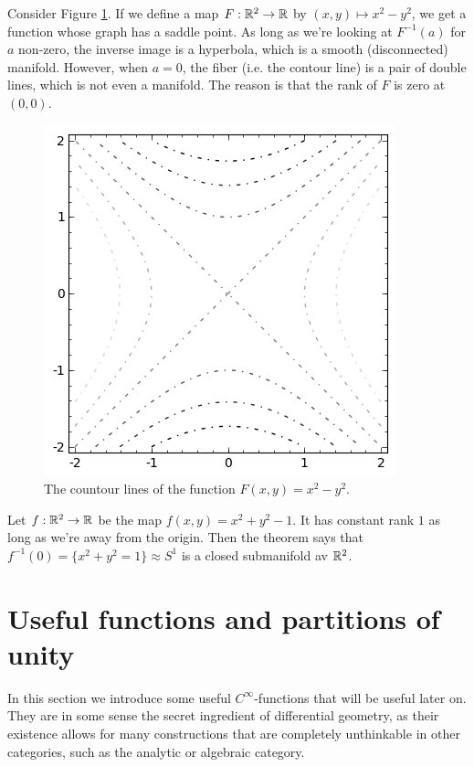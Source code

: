 \documentclass[11pt, english]{article}
\begin{document}
\begin{example}
Consider Figure \ref{contour}. If we define a map $F:\mathbb{R}^2\to \mathbb{R}$ by $(x,y) \mapsto x^2-y^2$, we get a function whose graph has a saddle point. As long as we're looking at $F^{-1}(a)$ for $a$ non-zero, the inverse image is a hyperbola, which is a smooth (disconnected) manifold. However, when $a=0$, the fiber (i.e. the contour line) is a pair of double lines, which is not even a manifold. The reason is that the rank of $F$ is zero at $(0,0)$.
\begin{figure}[ht]
\begin{center}
\includegraphics[scale=0.7]{contours}
\end{center}
\caption{The countour lines of the function $F(x,y)=x^2-y^2$.}
\label{contour}
\end{figure}
\end{example}

\begin{example}
Let $f:\mathbb{R}^2 \to \mathbb{R}$ be the map $f(x,y)=x^2+y^2-1$. It has constant rank $1$ as long as we're away from the origin. Then the theorem says that $f^{-1}(0)=\{ x^2+y^2=1 \}\approx S^1$ is a closed submanifold av $\mathbb{R}^2$.
\end{example}

\newpage
\section{Useful functions and partitions of unity}

In this section we introduce some useful $C^\infty$-functions that will be useful later on. They are in some sense the secret ingredient of differential geometry, as their existence allows for many constructions that are completely unthinkable in other categories, such as the analytic or algebraic category.
\end{document}

